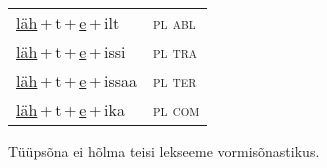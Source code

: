 \begin{minipage}{\textwidth}
\begin{sideways}
\begin{tabular}{l l}
\underline{läh}\,+\,t\,+\,\underline{e}\,+\,ilt & \textsc{ pl abl } \\
\underline{läh}\,+\,t\,+\,\underline{e}\,+\,issi & \textsc{ pl tra } \\
\underline{läh}\,+\,t\,+\,\underline{e}\,+\,issaa & \textsc{ pl ter } \\
\underline{läh}\,+\,t\,+\,\underline{e}\,+\,ika & \textsc{ pl com } \\
\end{tabular}
\end{sideways}
\label{tab:tüüpsõnamall-lähe}

\end{minipage}

 
\vspace{1em}
\noindent Tüüpsõna ei hõlma teisi lekseeme vormi\-sõnastikus.
